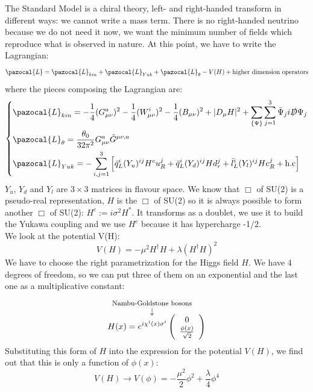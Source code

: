 \documentclass[../main.tex]{subfiles}
\begin{document}
The Standard Model is a chiral theory, left- and right-handed transform in different ways: we cannot write a mass term. There is no right-handed neutrino because we do not need it now, we want the minimum number of fields which reproduce what is observed in nature. At this point, we have to write the Lagrangian:
\[
\pazocal{L}=\pazocal{L}_{kin}+\pazocal{L}_{Yuk}+\pazocal{L}_\theta-V(H)+\text{higher dimension operators}
\]
where the pieces composing the Lagrangian are:
\[
\left\{
\begin{aligned}
&\pazocal{L}_{kin}=-\frac{1}{4}(G_{\mu\nu}^a)^2-\frac{1}{4}(W_{\mu\nu}^i)^2-\frac{1}{4}(B_{\mu\nu})^2+|D_\mu H|^2+\sum_{\{\Psi\}}\sum_{j=1}^{3}\Bar{\Psi}_ji\slashed{D}\Psi_j\\
&\pazocal{L}_\theta=\frac{\theta_0}{32\pi^2}G_{\mu\nu}^a\Tilde{G}^{\mu\nu,a}\\
&\pazocal{L}_{Yuk}=-\sum_{i,j=1}^3\left[\bar{q}_L^i(Y_u)^{ij}H^cu_R^j+\bar{q}_L^i(Y_d)^{ij}Hd_r^j+\bar{l}_L^i(Y_l)^{ij}He_R^j+\text{h.c}\right]
\end{aligned}
\right.
\]
$Y_u$, $Y_d$ and $Y_l$ are $3\times3$ matrices in flavour space. We know that $\Box$ of SU(2) is a pseudo-real representation, $H$ is the $\Box$ of SU(2) so it is always possible to form another $\Box$ of SU(2): $H^c:=i\sigma^2H^*$. It transforms as a doublet, we use it to build the Yukawa coupling and we use $H^c$ because it has hypercharge -1/2.\\
We look at the potential V(H):
\[
V(H)=-\mu^2H^\dagger H+\lambda(H^\dagger H)^2
\]
We have to choose the right parametrization for the Higgs field $H$. We have 4 degrees of freedom, so we can put three of them on an exponential and the last one as a multiplicative constant:
\[
H(x)=e^{i\overset{\mathclap{\tikz \node {$\downarrow$} node [above=1ex] {\footnotesize  Nambu-Goldstone bosons};}}{\chi^i(x)}\sigma^i}\left(\begin{array}{c}0\\\frac{\phi(x)}{\sqrt{2}}\end{array}\right)
\]
Substituting this form of $H$ into the expression for the potential $V(H)$, we find out that this is only a function of $\phi(x)$:
\[
V(H)\xrightarrow[]{}V(\phi)=-\frac{\mu^2}{2}\phi^2+\frac{\lambda}{4}\phi^4
\]
\end{document}
